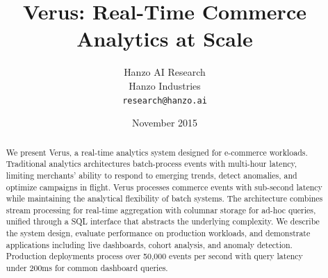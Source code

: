 \documentclass[11pt,twocolumn]{article}
\title{Verus: Real-Time Commerce Analytics at Scale}
\author{Hanzo AI Research\\
Hanzo Industries\\
\texttt{research@hanzo.ai}}
\date{November 2015}
\begin{document}
\hanzocoverpage

\begin{abstract}
We present Verus, a real-time analytics system designed for e-commerce workloads. Traditional analytics architectures batch-process events with multi-hour latency, limiting merchants' ability to respond to emerging trends, detect anomalies, and optimize campaigns in flight. Verus processes commerce events with sub-second latency while maintaining the analytical flexibility of batch systems. The architecture combines stream processing for real-time aggregation with columnar storage for ad-hoc queries, unified through a SQL interface that abstracts the underlying complexity. We describe the system design, evaluate performance on production workloads, and demonstrate applications including live dashboards, cohort analysis, and anomaly detection. Production deployments process over 50,000 events per second with query latency under 200ms for common dashboard queries.
\end{abstract}









\end{document}
